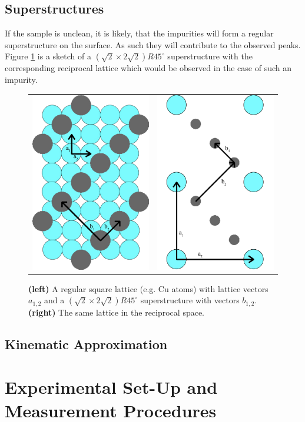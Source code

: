 \documentclass[a4paper]{scrartcl}
\numberwithin{equation}{section}
\numberwithin{figure}{section}
\numberwithin{table}{section}
\begin{document}
\subsection{Superstructures}
If the sample is unclean, it is likely, that the impurities will form a regular superstructure on the surface. As such they will contribute to the observed peaks. Figure \ref{fig:superstructure} is a sketch of a $(\sqrt{2} \times 2\sqrt{2})R45^\circ$ superstructure with the corresponding reciprocal lattice which would be observed in the case of such an impurity.
\begin{figure}[!bthp]
        \begin{center}
        \begin{tabular}{l r}
        		\includegraphics[width=0.2\linewidth]{pic/superstructure.pdf}
       	&
       		\includegraphics[width=0.2\linewidth]{pic/superstructure2.pdf}
		  \end{tabular}
        \end{center}
        \caption{
			\small \textbf{(left)} A regular square lattice (e.g. Cu atoms) with lattice vectors $a_{1,2}$ and a  $(\sqrt{2} \times 2\sqrt{2})R45^\circ$ superstructure with vectors $b_{1,2}$.
			\textbf{(right)} The same lattice in the reciprocal space.
        }
        \label{fig:superstructure}
\end{figure}


\subsection{Kinematic Approximation}

\section{Experimental Set-Up and Measurement Procedures}
\end{document}
